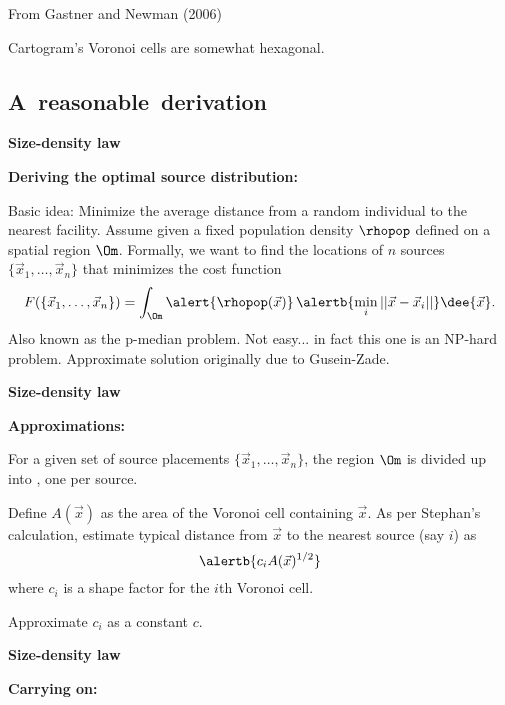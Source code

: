   {\small
    From Gastner and Newman (2006)\cite{gastner2006c}
  }
  
   Cartogram's Voronoi cells are somewhat hexagonal.
  
  

\subsection{A\ reasonable\ derivation}

  \textbf{Size-density law}

  \textbf{Deriving the optimal source distribution:}
    
     \alert{Basic idea:} Minimize the average distance
      from a random individual to the nearest facility.\cite{gastner2006c}
     Assume given a fixed population density $\rhopop$ defined
      on a spatial region $\Om$.
     Formally, we want to find the locations of 
      \alert{$n$ sources} $\{\vec{x}_1,\ldots,\vec{x}_n\}$
      that minimizes the \alert{cost function}
      $$
      F(\{\vec{x}_1,\ldots,\vec{x}_n\})
      =
      \int_{\Om}
      \alert{\rhopop(\vec{x})}
      \,
      \alertb{\min_{i}
      || \vec{x} - \vec{x}_i ||}
      \dee{\vec{x}}.
      $$
     Also known as the p-median problem.
     Not easy...  {in fact this one is an NP-hard problem.\cite{gastner2006c}}
     Approximate solution originally due to
      Gusein-Zade\cite{gusein-zade1982a}.
    
  


  \textbf{Size-density law}

  \textbf{Approximations:}
    
     For a given set of source placements $\{\vec{x}_1,\ldots,\vec{x}_n\}$,
      the region $\Om$ is divided up into 
      ,
      one per source.
    
      Define \alert{$A(\vec{x})$} as the \alert{area} of the 
      Voronoi cell containing $\vec{x}$.
     As per Stephan's calculation, estimate
      typical distance from $\vec{x}$ to the nearest source (say $i$)
      as 
      $$
      \alertb{c_i A(\vec{x})^{1/2}}
      $$
      where $c_i$ is a shape factor for the $i$th Voronoi cell.
     
      Approximate $c_i$ as a constant $c$.
    
  


  \textbf{Size-density law}

  \textbf{Carrying on:}
    
